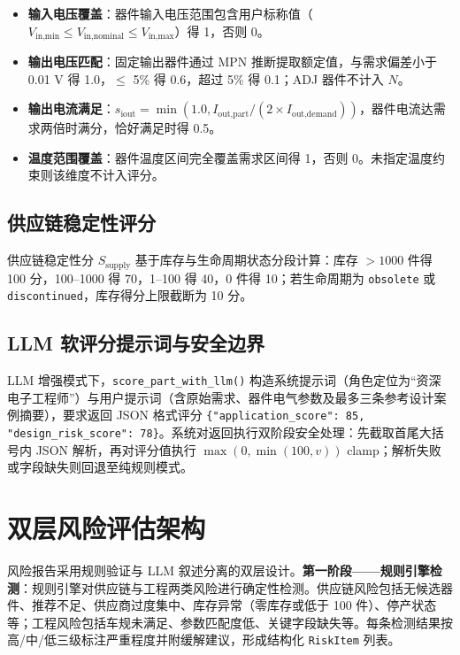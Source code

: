 \begin{itemize}
\item \textbf{输入电压覆盖}：器件输入电压范围包含用户标称值（$V_{\text{in,min}} \le V_{\text{in,nominal}} \le V_{\text{in,max}}$）得 1，否则 0。
\item \textbf{输出电压匹配}：固定输出器件通过 MPN 推断提取额定值，与需求偏差小于 0.01 V 得 1.0，$\le$ 5\% 得 0.6，超过 5\% 得 0.1；ADJ 器件不计入 $N$。
\item \textbf{输出电流满足}：$s_{\text{iout}} = \min(1.0, I_{\text{out,part}} / (2 \times I_{\text{out,demand}}))$，器件电流达需求两倍时满分，恰好满足时得 0.5。
\item \textbf{温度范围覆盖}：器件温度区间完全覆盖需求区间得 1，否则 0。未指定温度约束则该维度不计入评分。
\end{itemize}

\subsection{供应链稳定性评分}

供应链稳定性分 $S_{\text{supply}}$ 基于库存与生命周期状态分段计算：库存 $>1000$ 件得 100 分，100–1000 得 70，1–100 得 40，0 件得 10；若生命周期为 \texttt{obsolete} 或 \texttt{discontinued}，库存得分上限截断为 10 分。

\subsection{LLM 软评分提示词与安全边界}

LLM 增强模式下，\texttt{score\_part\_with\_llm()} 构造系统提示词（角色定位为“资深电子工程师”）与用户提示词（含原始需求、器件电气参数及最多三条参考设计案例摘要），要求返回 JSON 格式评分 \texttt{\{"application\_score": 85, "design\_risk\_score": 78\}}。系统对返回执行双阶段安全处理：先截取首尾大括号内 JSON 解析，再对评分值执行 $\max(0, \min(100, v))$ clamp；解析失败或字段缺失则回退至纯规则模式。

\section{双层风险评估架构}

风险报告采用规则验证与 LLM 叙述分离的双层设计。\textbf{第一阶段——规则引擎检测}：规则引擎对供应链与工程两类风险进行确定性检测。供应链风险包括无候选器件、推荐不足、供应商过度集中、库存异常（零库存或低于 100 件）、停产状态等；工程风险包括车规未满足、参数匹配度低、关键字段缺失等。每条检测结果按高/中/低三级标注严重程度并附缓解建议，形成结构化 \texttt{RiskItem} 列表。

